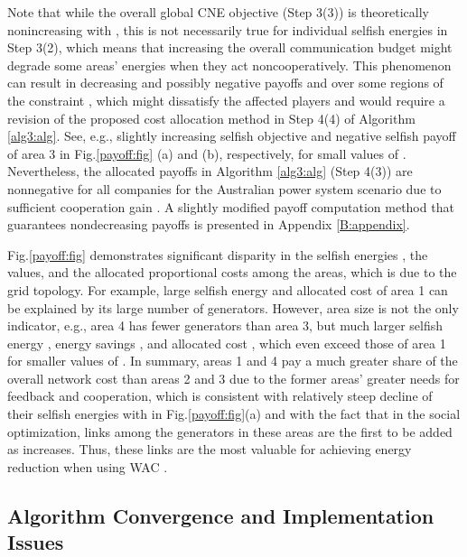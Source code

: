 \documentclass[12pt, draftclsnofoot,onecolumn]{IEEEtran}
\begin{document}
Note that while the overall global CNE objective  (Step 3(3)) is theoretically nonincreasing with , this is not necessarily true for individual selfish energies  in Step 3(2), which means that increasing the overall communication budget might degrade some areas' energies when they act noncooperatively. This phenomenon can result in decreasing and possibly negative payoffs  and  over some regions of the constraint , which might dissatisfy the affected players and would require a revision of the proposed cost allocation method in Step 4(4) of Algorithm \ref{alg3:alg}. See, e.g., slightly increasing selfish objective  and negative selfish payoff  of area 3 in Fig.{\ref{payoff:fig}} (a) and (b), respectively, for small values of . Nevertheless, the allocated payoffs  in Algorithm \ref{alg3:alg} (Step 4(3)) are nonnegative for all companies for the Australian power system scenario due to sufficient cooperation gain . A slightly modified payoff computation method that guarantees nondecreasing payoffs is presented in Appendix \ref{B:appendix}.

Fig.\ref{payoff:fig} demonstrates significant disparity in the selfish energies , the  values, and the allocated proportional costs  among the areas, which is due to the grid topology. For example, large selfish energy and allocated cost of area 1 can be explained by its large number of generators. However, area size is not the only indicator, e.g., area 4 has fewer generators than area 3, but much larger selfish energy , energy savings , and allocated cost , which even exceed those of area 1 for smaller values of . In summary, areas 1 and 4 pay a much greater share of the overall network cost than areas 2 and 3 due to the former areas' greater needs for feedback and cooperation, which is consistent with relatively steep decline of their selfish energies with  in Fig.\ref{payoff:fig}(a) and with the fact that in the social optimization, links among the generators in these areas are the first to be added as  increases. Thus, these links are the most valuable for achieving energy reduction when using WAC \cite{dorjovchebulTPS14}.


\subsection{Algorithm Convergence and Implementation Issues}
\label{convergence:sec}
\end{document}
